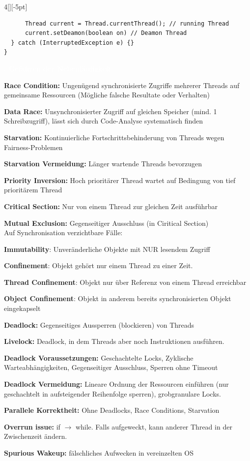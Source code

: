 \documentclass[%
	pdftex,%
	a4paper,%
	landscape,%
	ngerman,
	oneside,%
	6pt,%
	halfparskip,%
]{scrbook}
\newenvironment{mainbox}{%
  \def\FrameCommand{\fboxrule 1px \fcolorbox{black}{spec_blue}}%
  \MakeFramed {\advance\hsize-\width \FrameRestore}}%
 {\endMakeFramed}
\newcommand{\maintopic}[1]{\setcounter{subtopicenum}{0}\setcounter{subsubtopicenum}{0}\vspace{-4px}\begin{mainbox}\textcolor{white}{\textbf{\large{\stepcounter{maintopicenum}\Roman{maintopicenum}. #1}}}\end{mainbox}\vspace{-4px}}
\newenvironment{tight-itemize}
{ \begin{itemize}[leftmargin=*, nosep]
    \setlength{\itemsep}{0px}
    \setlength{\parskip}{0px}
    \setlength{\parsep}{0px}  }
{ \end{itemize}                  }
\begin{document}
\begin{multicols}{4}[][-5pt]
\begin{lstlisting}
	  Thread current = Thread.currentThread(); // running Thread
	  current.setDeamon(boolean on) // Deamon Thread
  } catch (InterruptedException e) {}
}
\end{lstlisting}
\maintopic{Gefahren der Nebenläufigkeit}
\begin{tight-itemize}
	\item{\textbf{Race Condition:} Ungenügend synchronisierte Zugriffe mehrerer Threads auf gemeinsame Ressourcen (Mögliche falsche Resultate oder Verhalten)}
	\item{\textbf{Data Race: } Unsynchronisierter Zugriff auf gleichen Speicher (mind. 1 Schreibzugriff), lässt sich durch Code-Analyse systematisch finden}
	\item{\textbf{Starvation:} Kontinuierliche Fortschrittsbehinderung von Threads wegen Fairness-Problemen}
	\item{\textbf{Starvation Vermeidung:} Länger wartende Threads bevorzugen}
	\item{\textbf{Priority Inversion:} Hoch prioritärer Thread wartet auf Bedingung von tief prioritärem Thread}
	\item{\textbf{Critical Section:} Nur von einem Thread zur gleichen Zeit ausführbar}
	\item{\textbf{Mutual Exclusion:} Gegenseitiger Ausschluss (in Ciritical Section) \\
	Auf Synchronisation verzichtbare Fälle:}
	\begin{tight-itemize}
		\item{\textbf{Immutability}: Unveränderliche Objekte mit NUR lesendem Zugriff}
		\item{\textbf{Confinement}: Objekt gehört nur einem Thread zu einer Zeit.}
	\end{tight-itemize}
	\item{\textbf{Thread Confinement}: Objekt nur über Referenz von einem Thread erreichbar}
	\item{\textbf{Object Confinement}: Objekt in anderem bereits synchronisierten Objekt eingekapselt}
	\item{\textbf{Deadlock:} Gegenseitiges Aussperren (blockieren) von Threads}
	\item{\textbf{Livelock:} Deadlock, in dem Threads aber noch Instruktionen ausführen.}
	\item{\textbf{Deadlock Voraussetzungen:} Geschachtelte Locks, Zyklische Warteabhängigkeiten, Gegenseitiger Ausschluss, Sperren ohne Timeout}
	\item{\textbf{Deadlock Vermeidung:} Lineare Ordnung der Ressourcen einführen (nur geschachtelt in aufsteigender Reihenfolge sperren), grobgranulare Locks.}
	\item{\textbf{Parallele Korrektheit:} Ohne Deadlocks, Race Conditions, Starvation}
	\item{\textbf{Overrun issue:} if $\rightarrow$ while. Falls aufgeweckt, kann anderer Thread in der Zwischenzeit ändern.}
	\item{\textbf{Spurious Wakeup:} fälschliches Aufwecken in vereinzelten OS}
\end{tight-itemize}


\end{multicols}
\end{document}
